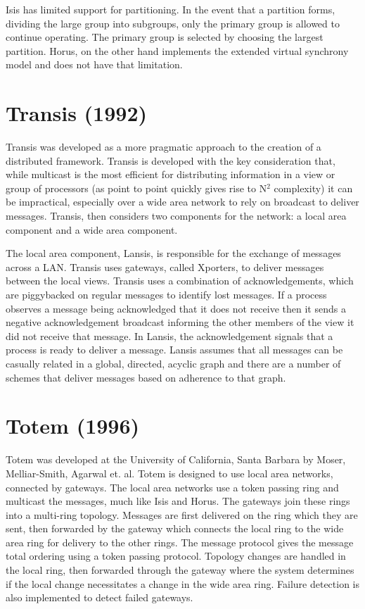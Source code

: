 Isis has limited support for partitioning. In the event that a partition forms, dividing the large group into subgroups, only the primary group is allowed to continue operating. The primary group is selected by choosing the largest partition. Horus, on the other hand implements the extended virtual synchrony model and does not have that limitation.

\section{Transis (1992)}

Transis \cite{TRANSISTOOLKIT} was developed as a more pragmatic approach to the creation of a distributed framework. Transis is developed with the key consideration that, while multicast is the most efficient for distributing information in a view or group of processors (as point to point quickly gives rise to N$^{2}$ complexity) it can be impractical, especially over a wide area network to rely on broadcast to deliver messages. Transis, then considers two components for the network: a local area component and a wide area component.

The local area component, Lansis, is responsible for the exchange of messages across a LAN. Transis uses gateways, called Xporters, to deliver messages between the local views. Transis uses a combination of acknowledgements, which are piggybacked on regular messages to identify lost messages. If a process observes a message being acknowledged that it does not receive then it sends a negative acknowledgement broadcast informing the other members of the view it did not receive that message. In Lansis, the acknowledgement signals that a process is ready to deliver a message. Lansis assumes that all messages can be casually related in a global, directed, acyclic graph and there are a number of schemes that deliver messages based on adherence to that graph.

 

\section{Totem (1996)}

Totem\cite{TOTEMTOOLKIT} was developed at the University of California, Santa Barbara by Moser, Melliar-Smith, Agarwal et. al. Totem is designed to use local area networks, connected by gateways. The local area networks use a token passing ring and multicast the messages, much like Isis and Horus. The gateways join these rings into a multi-ring topology. Messages are first delivered on the ring which they are sent, then forwarded by the gateway which connects the local ring to the wide area ring for delivery to the other rings. The message protocol gives the message total ordering using a token passing protocol. Topology changes are handled in the local ring, then forwarded through the gateway where the system determines if the local change necessitates a change in the wide area ring. Failure detection is also implemented to detect failed gateways.

